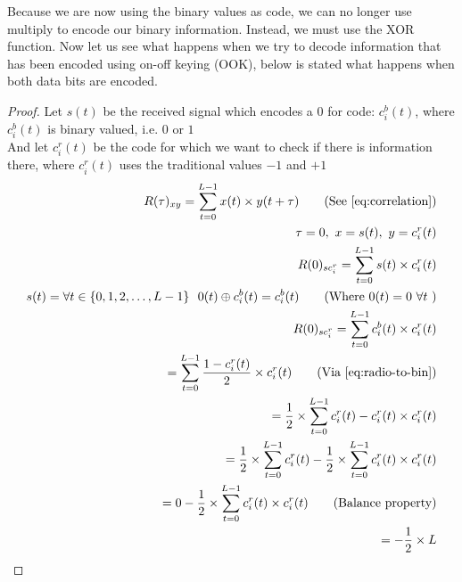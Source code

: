 		Because we are now using the binary values as code, we can no longer use multiply to encode our binary information.
		Instead, we must use the XOR function.
		Now let us see what happens when we try to decode information that has been encoded using on-off keying (OOK), below is stated what happens when both data bits are encoded.

		\begin{proof}
			Let $s(t)$ be the received signal which encodes a 0 for code: $c^b_i(t)$, where $c^b_i(t)$ is binary valued, i.e. $0$ or $1$ \\
			And let $c^r_i(t)$ be the code for which we want to check if there is information there, where $c^r_i(t)$ uses the traditional values $-1$ and $+1$ \\

			\begin{align*}
				R(\tau)_{xy} = \displaystyle\sum_{t = 0} ^ {L - 1} x(t) \times y(t + \tau)	\tag{See \autoref{eq:correlation}}
				\\ \tau = 0,\ x = s(t),\ y = c^r_i(t)	
				\\ R(0)_{sc^r_{i}} = \displaystyle\sum_{t = 0} ^ {L - 1} s(t) \times c^r_i(t)	
				\\ s(t) = \forall t \in \{ 0, 1, 2, \dotsc, L - 1 \} \ \ 0(t) \oplus c^b_i(t) = c^b_i(t) \tag{Where $0(t) = 0 \ \forall t$ }										
				\\ R(0)_{sc^r_{i}} = \displaystyle\sum_{t = 0} ^ {L - 1} c^b_i(t) \times c^r_i(t)
				\\ = \displaystyle\sum_{t = 0} ^ {L - 1} \frac{1 - c^r_i(t)}{2} \times c^r_i(t) \tag{Via \autoref{eq:radio-to-bin}}
				\\ = \frac{1}{2} \times \displaystyle\sum_{t = 0} ^ {L - 1} c^r_i(t) - c^r_i(t) \times c^r_i(t)
				\\ = \frac{1}{2} \times \displaystyle\sum_{t = 0} ^ {L - 1} c^r_i(t) - \frac{1}{2} \times \displaystyle\sum_{t = 0} ^ {L - 1} c^r_i(t) \times c^r_i(t)
				\\ = 0 - \frac{1}{2} \times \displaystyle\sum_{t = 0} ^ {L - 1} c^r_i(t) \times c^r_i(t) \tag{Balance property}
				\\ = - \frac{1}{2} \times L
			\end{align*}

		\end{proof}

